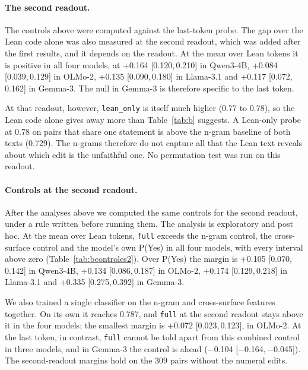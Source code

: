 \documentclass[10pt]{article}
\newcommand{\vr}[1]{\texttt{#1}}
\newcommand{\ic}[2]{[#1,\,#2]}
\begin{document}
\paragraph{The second readout.}
The controls above were computed against the last-token probe. The gap over the Lean code alone was also measured at the second readout, which was added after the first results, and it depends on the readout. At the mean over
Lean tokens it is positive in all four models, at +0.164 \ic{0.120}{0.210} in Qwen3-4B, +0.084 \ic{0.039}{0.129} in
OLMo-2, +0.135 \ic{0.090}{0.180} in Llama-3.1 and +0.117 \ic{0.072}{0.162} in Gemma-3. The null in Gemma-3 is
therefore specific to the last token.

At that readout, however, \vr{lean\_only} is itself much higher (0.77 to 0.78), so the Lean code alone gives away more
than Table~\ref{tab:b} suggests. A Lean-only probe at 0.78 on pairs that share one statement is above the n-gram
baseline of both texts (0.729). The n-grams therefore do not capture all that the Lean text reveals about which
edit is the unfaithful one. No permutation test was run on this readout.

\paragraph{Controls at the second readout.} After the analyses above we computed the same controls for the second
readout, under a rule written before running them. The analysis is exploratory and post hoc. At the mean over Lean
tokens, \vr{full} exceeds the n-gram control, the cross-surface control and the model's own P(Yes) in all four models,
with every interval above zero (Table~\ref{tab:bcontroles2}). Over P(Yes) the margin is +0.105 \ic{0.070}{0.142} in
Qwen3-4B, +0.134 \ic{0.086}{0.187} in OLMo-2, +0.174 \ic{0.129}{0.218} in Llama-3.1 and +0.335 \ic{0.275}{0.392} in
Gemma-3.

We also trained a single classifier on the n-gram and cross-surface features together. On its own it reaches 0.787,
and \vr{full} at the second readout stays above it in the four models; the smallest margin is +0.072
\ic{0.023}{0.123}, in OLMo-2. At the last token, in contrast, \vr{full} cannot be told apart from this combined
control in three models, and in Gemma-3 the control is ahead (−0.104 \ic{−0.164}{−0.045}). The second-readout margins
hold on the 309 pairs without the numeral edits.
\end{document}
